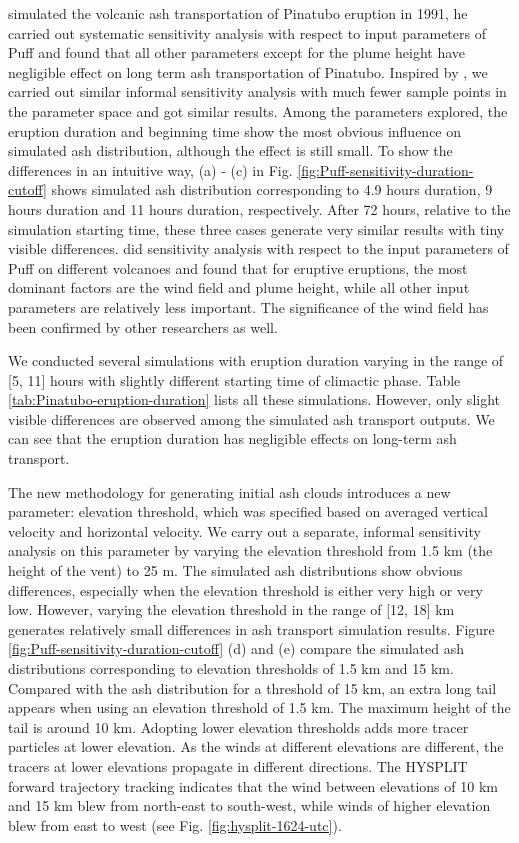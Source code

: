 \documentclass[utf8]{frontiersSCNS} %
\begin{document}
\citet{fero2008simulation} simulated the volcanic ash transportation of Pinatubo eruption in 1991, he carried out systematic sensitivity analysis with respect to input parameters of Puff and found that all other parameters except for the plume height have negligible effect on long term ash transportation of Pinatubo. Inspired by \citet{fero2008simulation}, we carried out similar informal sensitivity analysis with much fewer sample points in the parameter space and got similar results. Among the parameters explored, the eruption duration and beginning time show the most obvious influence on simulated ash distribution, although the effect is still small. To show the differences in an intuitive way, (a) - (c) in Fig. \ref{fig:Puff-sensitivity-duration-cutoff} shows simulated ash distribution corresponding to 4.9 hours duration, 9 hours duration and 11 hours duration, respectively. After 72 hours, relative to the simulation starting time, these three cases generate very similar results with tiny visible differences. \citet{daniele2009applications} did sensitivity analysis with respect to the input parameters of Puff on different volcanoes and found that for eruptive eruptions, the most dominant factors are the wind field and plume height, while all other input parameters are relatively less important. The significance of the wind field has been confirmed by other researchers \citep[e.g]{stefanescu2014fast} as well.

We conducted several simulations with eruption duration varying in the range of [5, 11] hours with slightly different starting time of climactic phase. Table \ref{tab:Pinatubo-eruption-duration} lists all these simulations. However, only slight visible differences are observed among the simulated ash transport outputs. We can see that the eruption duration has negligible effects on long-term ash transport.

The new methodology for generating initial ash clouds introduces a new parameter: elevation threshold, which was specified based on averaged vertical velocity and horizontal velocity. We carry out a separate, informal sensitivity analysis on this parameter by varying the elevation threshold from 1.5 km (the height of the vent) to 25 m. The simulated ash distributions show obvious differences, especially when the elevation threshold is either very high or very low. However, varying the elevation threshold in the range of [12, 18] km generates relatively small differences in ash transport simulation results.  Figure \ref{fig:Puff-sensitivity-duration-cutoff} (d) and (e) compare the simulated ash distributions corresponding to elevation thresholds of 1.5 km and 15 km. Compared with the ash distribution for a threshold of 15 km, an extra long tail appears when using an elevation threshold of 1.5 km. The maximum height of the tail is around 10 km. Adopting lower elevation thresholds adds more tracer particles at lower elevation. As the winds at different elevations are different, the tracers at lower elevations propagate in different directions. The HYSPLIT forward trajectory tracking indicates that the wind between elevations of 10 km and 15 km blew from north-east to south-west, while winds of higher elevation blew from east to west (see Fig. \ref{fig:hysplit-1624-utc}).
\end{document}
